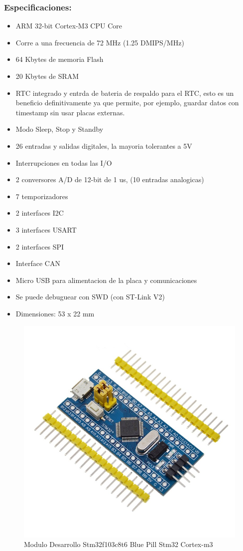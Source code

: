 \documentclass[12pt,oneside,spanish]{article}
\begin{document}
\subsubsection{Especificaciones:}
\begin{itemize}
    \item ARM 32-bit Cortex-M3 CPU Core
    \item Corre a una frecuencia de 72 MHz (1.25 DMIPS/MHz)
    \item 64 Kbytes de memoria Flash
    \item 20 Kbytes de SRAM
    \item RTC integrado y entrda de bateria de respaldo para el RTC, esto es un beneficio definitivamente ya que permite, por ejemplo, guardar datos con timestamp sin usar placas externas.
    \item Modo Sleep, Stop y Standby
    \item 26 entradas y salidas digitales, la mayoria tolerantes a 5V
    \item Interrupciones en todas las I/O
    \item 2 conversores A/D de 12-bit de 1 us, (10 entradas analogicas)
    \item 7 temporizadores
    \item 2 interfaces I2C
    \item 3 interfaces USART
    \item 2 interfaces SPI
    \item Interface CAN
    \item Micro USB para alimentacion de la placa y comunicaciones
    \item Se puede debuguear con SWD (con ST-Link V2)
    \item Dimensiones: 53 x 22 mm 
\end{itemize}
\begin{figure}[H]
    \centering
    \includegraphics[scale=0.5]{STM32CubeIDE/stm32.jpg}
    \caption{Modulo Desarrollo Stm32f103c8t6 Blue Pill Stm32 Cortex-m3}
    \end{figure}
\end{document}
